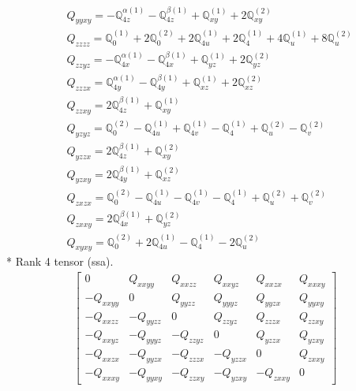 \documentclass[fleqn,8pt,landscape]{jsarticle}
\begin{document}
\begin{align*}
& Q_{yyxy} = - \mathbb{Q}_{4z}^{\alpha(1)} - \mathbb{Q}_{4z}^{\beta(1)} + \mathbb{Q}_{xy}^{(1)} + 2 \mathbb{Q}_{xy}^{(2)} \\
& Q_{zzzz} = \mathbb{Q}_{0}^{(1)} + 2 \mathbb{Q}_{0}^{(2)} + 2 \mathbb{Q}_{4u}^{(1)} + 2 \mathbb{Q}_{4}^{(1)} + 4 \mathbb{Q}_{u}^{(1)} + 8 \mathbb{Q}_{u}^{(2)} \\
& Q_{zzyz} = - \mathbb{Q}_{4x}^{\alpha(1)} - \mathbb{Q}_{4x}^{\beta(1)} + \mathbb{Q}_{yz}^{(1)} + 2 \mathbb{Q}_{yz}^{(2)} \\
& Q_{zzzx} = \mathbb{Q}_{4y}^{\alpha(1)} - \mathbb{Q}_{4y}^{\beta(1)} + \mathbb{Q}_{xz}^{(1)} + 2 \mathbb{Q}_{xz}^{(2)} \\
& Q_{zzxy} = 2 \mathbb{Q}_{4z}^{\beta(1)} + \mathbb{Q}_{xy}^{(1)} \\
& Q_{yzyz} = \mathbb{Q}_{0}^{(2)} - \mathbb{Q}_{4u}^{(1)} + \mathbb{Q}_{4v}^{(1)} - \mathbb{Q}_{4}^{(1)} + \mathbb{Q}_{u}^{(2)} - \mathbb{Q}_{v}^{(2)} \\
& Q_{yzzx} = 2 \mathbb{Q}_{4z}^{\beta(1)} + \mathbb{Q}_{xy}^{(2)} \\
& Q_{yzxy} = 2 \mathbb{Q}_{4y}^{\beta(1)} + \mathbb{Q}_{xz}^{(2)} \\
& Q_{zxzx} = \mathbb{Q}_{0}^{(2)} - \mathbb{Q}_{4u}^{(1)} - \mathbb{Q}_{4v}^{(1)} - \mathbb{Q}_{4}^{(1)} + \mathbb{Q}_{u}^{(2)} + \mathbb{Q}_{v}^{(2)} \\
& Q_{zxxy} = 2 \mathbb{Q}_{4x}^{\beta(1)} + \mathbb{Q}_{yz}^{(2)} \\
& Q_{xyxy} = \mathbb{Q}_{0}^{(2)} + 2 \mathbb{Q}_{4u}^{(1)} - \mathbb{Q}_{4}^{(1)} - 2 \mathbb{Q}_{u}^{(2)}
\end{align*}
* Rank 4 tensor (ssa).
\begin{align*}
\begin{bmatrix} 0 & Q_{xxyy} & Q_{xxzz} & Q_{xxyz} & Q_{xxzx} & Q_{xxxy} \\ - Q_{xxyy} & 0 & Q_{yyzz} & Q_{yyyz} & Q_{yyzx} & Q_{yyxy} \\ - Q_{xxzz} & - Q_{yyzz} & 0 & Q_{zzyz} & Q_{zzzx} & Q_{zzxy} \\ - Q_{xxyz} & - Q_{yyyz} & - Q_{zzyz} & 0 & Q_{yzzx} & Q_{yzxy} \\ - Q_{xxzx} & - Q_{yyzx} & - Q_{zzzx} & - Q_{yzzx} & 0 & Q_{zxxy} \\ - Q_{xxxy} & - Q_{yyxy} & - Q_{zzxy} & - Q_{yzxy} & - Q_{zxxy} & 0 \end{bmatrix}
\end{align*}
\end{document}

